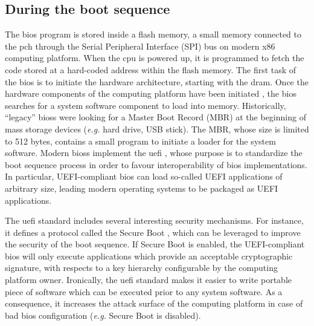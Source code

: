 \subsection{During the boot sequence}
\label{subsec:usecase:firm:boot}

The \ac{bios} program is stored inside a flash memory, a small memory connected
to the \ac{pch} through the Serial Peripheral Interface (SPI) bus on modern x86
computing platform.
%
When the \ac{cpu} is powered up, it is programmed to fetch the code stored at a
hard-coded address within the flash memory.
%
The first task of the \ac{bios} is to initiate the hardware architecture,
starting with the \ac{dram}. 
%
Once the hardware components of the computing platform have been initiated , the
\ac{bios} searches for a system software component to load into memory.
%
Historically, ``legacy'' \acp{bios} were looking for a Master Boot Record (MBR)
at the beginning of mass storage devices (\emph{e.g.} hard drive, USB stick).
%
The MBR, whose size is limited to 512 bytes, contains a small program to
initiate a loader for the system software.
%
Modern \acp{bios} implement the \ac{uefi} , whose purpose is to standardize the
boot sequence process in order to favour interoperability of \ac{bios}
implementations.
%
In particular, UEFI-compliant \ac{bios} can load so-called UEFI applications of
arbitrary size, leading modern operating systems  to be packaged as UEFI
applications.

The \ac{uefi} standard includes several interesting security mechanisms. 
%
For instance, it defines a protocol called the Secure Boot , which can be
leveraged to improve the security of the boot sequence.
%
If Secure Boot is enabled, the UEFI-compliant \ac{bios} will only execute
applications which provide an acceptable cryptographic signature, with respects
to a key hierarchy configurable by the computing platform owner.
%
Ironically, the \ac{uefi} standard makes it easier to write portable piece of
software which can be executed prior to any system software.
%
As a consequence, it increases the attack surface of the computing platform in
case of bad \ac{bios} configuration (\emph{e.g.} Secure Boot is disabled).


